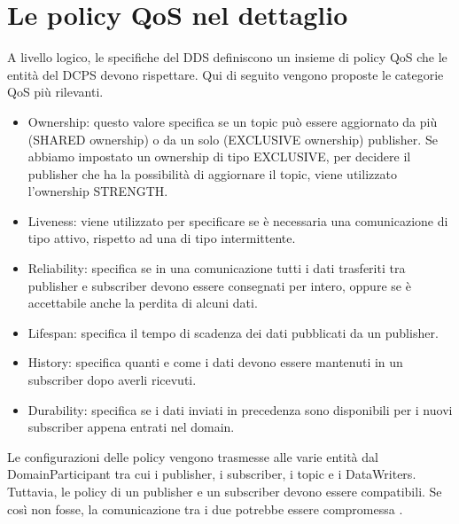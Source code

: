 \section{Le policy QoS nel dettaglio}
A livello logico, le specifiche del DDS
definiscono un insieme di policy QoS
che le entità del DCPS devono rispettare. Qui di seguito vengono
proposte le categorie QoS più rilevanti.
\begin{itemize}
    \item Ownership: questo valore specifica se un topic
    può essere aggiornato da più 
    (SHARED ownership) o da un solo (EXCLUSIVE ownership) publisher.
    Se abbiamo impostato un ownership di tipo EXCLUSIVE, per decidere il 
    publisher che ha la possibilità di aggiornare il topic, viene 
    utilizzato l'ownership STRENGTH.
    \item Liveness: viene utilizzato per specificare se è necessaria
    una comunicazione di tipo attivo, rispetto ad una di tipo 
    intermittente.
    \item Reliability: specifica se in una comunicazione tutti i dati
    trasferiti tra publisher e subscriber devono essere consegnati
    per intero, oppure
    se è accettabile anche la perdita di alcuni dati.
    \item Lifespan: specifica il tempo di scadenza dei dati pubblicati da 
    un publisher.
    \item History: specifica quanti e come i dati devono essere 
    mantenuti in un 
    subscriber dopo averli ricevuti.
    \item Durability: specifica se i dati inviati in precedenza sono
    disponibili per i nuovi subscriber appena entrati nel domain.
\end{itemize}
Le configurazioni 
delle policy vengono trasmesse alle varie entità dal DomainParticipant
tra cui i publisher, i subscriber, i topic e i DataWriters.
Tuttavia, le policy di un publisher e un subscriber devono essere compatibili.
Se così non fosse, la comunicazione tra i due potrebbe essere compromessa
\cite{Michaud2017Apr}.
\label{Le policy QoS nel dettaglio}



